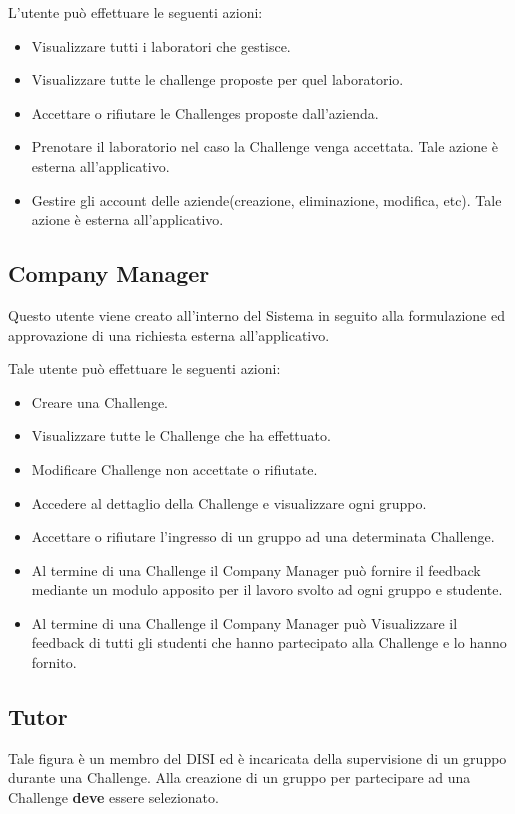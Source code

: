 L'utente può effettuare le seguenti azioni:
\begin{itemize}
    \item Visualizzare tutti i laboratori che gestisce. 
    \item Visualizzare tutte le challenge proposte per quel laboratorio.
    \item Accettare o rifiutare le Challenges proposte dall'azienda.
    \item Prenotare il laboratorio nel caso la Challenge venga accettata. Tale azione è esterna all'applicativo.
    \item Gestire gli account delle aziende(creazione, eliminazione, modifica, etc). Tale azione è esterna all'applicativo.
\end{itemize}


\subsection{Company Manager}

Questo utente viene creato all'interno del Sistema in seguito alla formulazione ed approvazione di una richiesta esterna all'applicativo.

Tale utente può effettuare le seguenti azioni:
\begin{itemize}
    \item Creare una Challenge.
    \item Visualizzare tutte le Challenge che ha effettuato.
    \item Modificare Challenge non accettate o rifiutate.
    \item Accedere al dettaglio della Challenge e visualizzare ogni gruppo.
    \item Accettare o rifiutare l'ingresso di un gruppo ad una determinata Challenge. 
    \item Al termine di una Challenge il Company Manager può fornire il feedback mediante un modulo apposito per il lavoro svolto ad ogni gruppo e studente. 
    \item Al termine di una Challenge il Company Manager può Visualizzare il feedback di tutti gli studenti che hanno partecipato alla Challenge e lo hanno fornito.
\end{itemize}

\subsection{Tutor}
Tale figura è un membro del DISI ed è incaricata della supervisione di un gruppo durante una Challenge. Alla creazione di un gruppo per partecipare ad una Challenge \textbf{deve} essere selezionato. 

